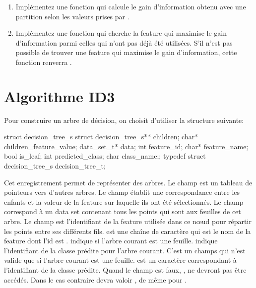 \documentclass[a4paper, 10pt]{article}
\begin{document}
\begin{enumerate}
\item Implémentez une fonction  qui calcule le gain d'information obtenu avec une partition selon les valeurs prises par .
\item Implémentez une fonction  qui cherche la feature qui maximise le gain d'information parmi celles qui n'ont pas déjà été utilisées. S'il n'est pas possible de trouver une feature qui maximise le gain d'information, cette fonction renverra .
\end{enumerate}

\section{Algorithme ID3}
Pour construire un arbre de décision, on choisit d'utiliser la structure suivante:
\begin{ccode}
struct decision_tree_s {struct decision_tree_s** children; char* children_feature_value; data_set_t* data; int feature_id; char* feature_name; bool is_leaf; int predicted_class; char class_name;};
typedef struct decision_tree_s decision_tree_t;
\end{ccode}
Cet enregistrement permet de représenter des arbres. Le champ  est un tableau de pointeurs vers d'autres arbres.
Le champ  établit une correspondance entre les enfants et la valeur de la feature sur laquelle ils ont été sélectionnés.
Le champ  correspond à un data set contenant tous les points qui sont aux feuilles de cet arbre.
Le champ  est l'identifiant de la feature utilisée dans ce nœud pour répartir les points entre ses différents fils.
 est une chaîne de caractère qui est le nom de la feature dont l'id est .
 indique si l'arbre courant est une feuille.
 indique l'identifiant de la classe prédite pour l'arbre courant. C'est un champs qui n'est valide que si l'arbre courant est une feuille.
 est un caractère correspondant à l'identifiant de la classe prédite.
Quand le champ  est faux, ,  ne devront pas être accédés. Dans le cas contraire  devra valoir , de même pour .
\end{document}
